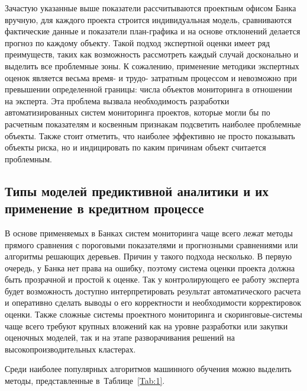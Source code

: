 \documentclass[12pt,a4paper]{article} %
\begin{document}
Зачастую указанные выше показатели рассчитываются проектным офисом Банка вручную, для каждого проекта строится индивидуальная модель, сравниваются фактические данные и показатели план-графика и на основе отклонений делается прогноз по каждому объекту. Такой подход экспертной оценки имеет ряд преимуществ, таких как возможность рассмотреть каждый случай досконально и выделить все проблемные зоны. К сожалению, применение методики экспертных оценок является весьма время- и трудо- затратным процессом и невозможно при превышении определенной границы: числа объектов мониторинга в отношении на эксперта. Эта проблема вызвала необходимость разработки автоматизированных систем мониторинга проектов, которые могли бы по расчетным показателям и косвенным признакам подсветить наиболее проблемные объекты. Также стоит отметить, что наиболее эффективно не просто показывать объекты риска, но и индицировать по каким причинам объект считается проблемным. 

\subsection{Типы моделей предиктивной аналитики и их применение в кредитном процессе}

В основе применяемых в Банках систем мониторинга чаще всего лежат методы прямого сравнения с пороговыми показателями и прогнозными сравнениями или алгоритмы решающих деревьев. Причин у такого подхода несколько. В первую очередь, у Банка нет права на ошибку, поэтому система оценки проекта должна быть прозрачной и простой к оценке. Так у контролирующего ее работу эксперта будет возможность доступно интерпретировать результат автоматического расчета и оперативно сделать выводы о его корректности и необходимости корректировок оценки. Также сложные системы проектного мониторинга и  скоринговые-системы чаще всего требуют крупных вложений как на уровне разработки или закупки оценочных моделей, так и на этапе разворачивания решений на высокопроизводительных кластерах.

Среди наиболее популярных алгоритмов машинного обучения можно выделить методы\cite{Mohri}, представленные в~Таблице~\ref{Tab:1}.
\end{document}

